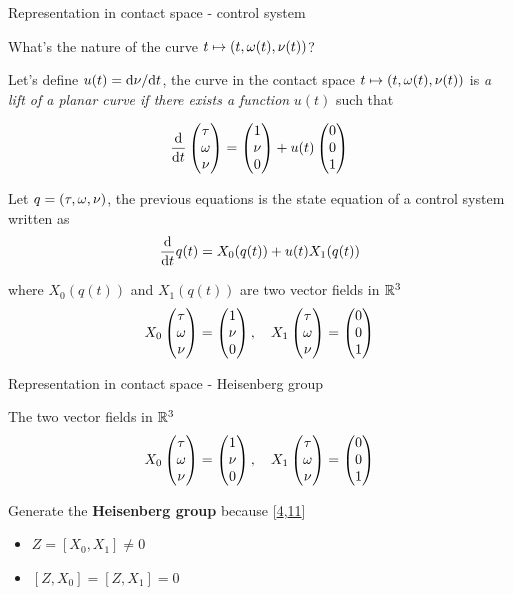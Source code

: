\documentclass[10pt,american,ignorenonframetext,aspectratio=1610]{beamer}
\providecommand{\tightlist}{%
  \setlength{\itemsep}{0pt}\setlength{\parskip}{0pt}}
\theoremstyle{remark}
\begin{document}
\begin{frame}{Representation in contact space - control system}
\protect\hypertarget{representation-in-contact-space---control-system}{}

What's the nature of the curve \(t\mapsto(t,\omega(t),\nu(t))\)?

Let's define \(u(t)=\mathrm{d}\nu/\mathrm{d}t\), the curve in the contact space
\(t\mapsto(t,\omega(t),\nu(t))\) is \emph{a lift of a planar curve if there
exists a function} \(u(t)\) such that

\[\frac{\mathrm{d}}{\mathrm{d}t}\begin{pmatrix}\tau\\\omega\\\nu\end{pmatrix} = \begin{pmatrix}1\\\nu\\0\end{pmatrix} + u(t)\begin{pmatrix}0\\0\\1\end{pmatrix}\]

Let \(q=(\tau,\omega,\nu)\), the previous equations is the state equation of
a control system written as \[\frac{\mathrm{d}}{\mathrm{d}t} q(t) = X_0(q(t)) + u(t) X_1(q(t))\]

where \(X_0(q(t))\) and \(X_1(q(t))\) are two vector fields in \(\mathbb{R}^3\)
\[X_0\begin{pmatrix}\tau\\\omega\\\nu\end{pmatrix} = \begin{pmatrix}1\\\nu\\0\end{pmatrix},\quad 
X_1\begin{pmatrix}\tau\\\omega\\\nu\end{pmatrix} = \begin{pmatrix}0\\0\\1\end{pmatrix}\]

\end{frame}

\begin{frame}{Representation in contact space - Heisenberg group}
\protect\hypertarget{representation-in-contact-space---heisenberg-group}{}

The two vector fields in \(\mathbb{R}^3\)
\[X_0\begin{pmatrix}\tau\\\omega\\\nu\end{pmatrix} = \begin{pmatrix}1\\\nu\\0\end{pmatrix},\quad 
X_1\begin{pmatrix}\tau\\\omega\\\nu\end{pmatrix} = \begin{pmatrix}0\\0\\1\end{pmatrix}\]

Generate the \textbf{Heisenberg group} because
{[}\protect\hyperlink{ref-boscain2021}{4},\protect\hyperlink{ref-grochenig2001}{11}{]}

\begin{itemize}
\tightlist
\item
  \(Z=[X_0,X_1]\neq 0\)
\item
  \([Z,X_0]=[Z,X_1]=0\)
\end{itemize}

\end{frame}
\end{document}
